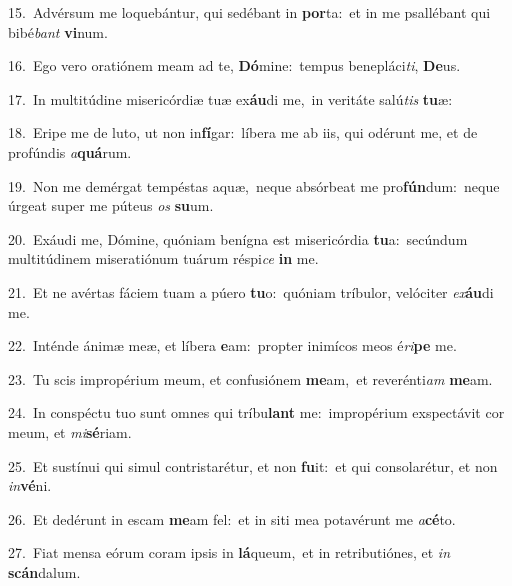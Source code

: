 {\numbfont\textcolor{\numbcolor}{15.}}~Advérsum me loquebántur, qui sedébant in \textbf{por}\-ta:~\star et in me psallébant qui bibé\textit{bant} \textbf{vi}\-num.\par
{\numbfont\textcolor{\numbcolor}{16.}}~Ego vero oratiónem meam ad te, \textbf{Dó}\-mine:~\star tempus benepláci\-\textit{ti}\-, \textbf{De}\-us.\par
{\numbfont\textcolor{\numbcolor}{17.}}~In multitúdine misericórdiæ tuæ ex\-\textbf{áu}\-di me,~\star in veritáte salú\textit{tis} \textbf{tu}\-æ:\par
{\numbfont\textcolor{\numbcolor}{18.}}~Eripe me de luto, ut non in\-\textbf{fí}\-gar:~\star líbera me ab iis, qui odérunt me, et de profúndis \textit{a}\-\textbf{quá}rum.\par
{\numbfont\textcolor{\numbcolor}{19.}}~Non me demérgat tempéstas aquæ,~\dagger neque absórbeat me pro\-\textbf{fún}\-dum:~\star neque úrgeat super me púteus \textit{os} \textbf{su}\-um.\par
{\numbfont\textcolor{\numbcolor}{20.}}~Exáudi me, Dómine, quóniam benígna est misericórdia \textbf{tu}\-a:~\star secúndum multitúdinem miseratiónum tuárum réspi\textit{ce} \textbf{in} me.\par
{\numbfont\textcolor{\numbcolor}{21.}}~Et ne avértas fáciem tuam a púero \textbf{tu}\-o:~\star quóniam tríbulor, velóciter \textit{ex}\-\textbf{áu}di me.\par
{\numbfont\textcolor{\numbcolor}{22.}}~Inténde ánimæ meæ, et líbera \textbf{e}\-am:~\star propter inimícos meos é\-\textit{ri}\-\textbf{pe} me.\par
{\numbfont\textcolor{\numbcolor}{23.}}~Tu scis impropérium meum, et confusiónem \textbf{me}\-am,~\star et reverénti\textit{am} \textbf{me}\-am.\par
{\numbfont\textcolor{\numbcolor}{24.}}~In conspéctu tuo sunt omnes qui tríbu\textbf{lant} me:~\star impropérium exspectávit cor meum, et \textit{mi}\-\textbf{sé}riam.\par
{\numbfont\textcolor{\numbcolor}{25.}}~Et sustínui qui simul contristarétur, et non \textbf{fu}\-it:~\star et qui consolarétur, et non \textit{in}\-\textbf{vé}ni.\par
{\numbfont\textcolor{\numbcolor}{26.}}~Et dedérunt in escam \textbf{me}\-am fel:~\star et in siti mea potavérunt me \textit{a}\-\textbf{cé}to.\par
{\numbfont\textcolor{\numbcolor}{27.}}~Fiat mensa eórum coram ipsis in \textbf{lá}\-queum,~\star et in retributiónes, et \textit{in} \textbf{scán}\-dalum.\par
